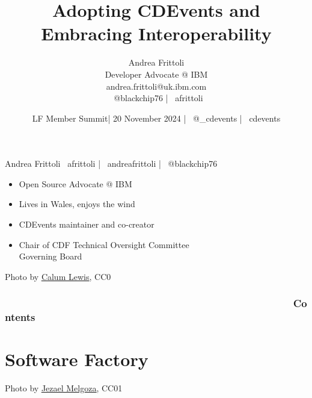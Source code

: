 \documentclass[aspectratio=169,11pt,hyperref={colorlinks=true}]{beamer}
\title{Adopting CDEvents and Embracing Interoperability}
\date[20 November 2024]{LF Member Summit| 20 November 2024 | \faTwitter ~@\_cdevents | \faGithub ~cdevents}
\author[Andrea Frittoli]{%
  Andrea Frittoli \\
  Developer Advocate @ IBM\\
  andrea.frittoli@uk.ibm.com \\
  \faTwitter ~@blackchip76 | \faGithub ~afrittoli\\
}
\begin{document}
\begin{frame}
\titlepage{}
\end{frame}

\begin{speakerframe}{Andrea Frittoli}%
  {%
  \faGithub ~afrittoli | \faLinkedin ~andreafrittoli | \faTwitter ~@blackchip76
  }%
  {%
  \begin{itemize}
    \item{Open Source Advocate @ IBM}
    \item{Lives in Wales, enjoys the wind}
    \item{CDEvents maintainer and co-creator}
    \item{Chair of CDF Technical Oversight Committee \\ Governing Board}
  \end{itemize}
  }%
\end{speakerframe}

\begin{lpicrblack}{%
  Photo by \href{https://unsplash.com/@calumlewis}{\underline{Calum Lewis}}, CC0
  }%
  {%
  \tableofcontents
  }%
  {}
  \frametitle{~~~~~~~~~~~~~~~~~~~~~~~~~~~~~~~~~~~~~~~~~~~~~~~~~~~Contents}
\end{lpicrblack}

\section[Software Factory]{Software Factory}

\begin{sectionwithpiclargecentral}{Photo by \href{https://unsplash.com/@jezar}{\underline{Jezael Melgoza}}, CC0}{1}
\end{sectionwithpiclargecentral}
\end{document}
